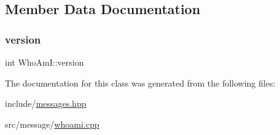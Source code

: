 \subsection{Member Data Documentation}
\mbox{\label{classWhoAmI_a5438cc57146d05f4f6b4fdfc155316fc}} 
\subsubsection{\texorpdfstring{version}{version}}
{\footnotesize\ttfamily int Who\+Am\+I\+::version\hspace{0.3cm}{\ttfamily [private]}}



The documentation for this class was generated from the following files\+:\begin{DoxyCompactItemize}
\item 
include/\mbox{\hyperlink{messages_8hpp}{messages.\+hpp}}\item 
src/message/\mbox{\hyperlink{whoami_8cpp}{whoami.\+cpp}}\end{DoxyCompactItemize}

